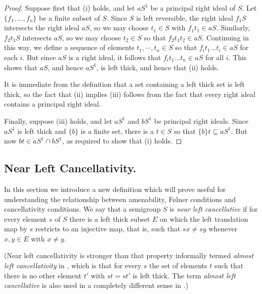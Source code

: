 \documentclass[11pt,a4paper,reqno]{amsart}
\begin{document}
\begin{proof}
Suppose first that (i) holds, and let $aS^1$ be a principal right ideal of
$S$. Let
$\lbrace f_1, \dots, f_n \rbrace$ be a finite subset of $S$. Since $S$ is left
reversible, the right ideal $f_1 S$ intersects the right ideal $aS$, so we may choose $t_1 \in S$ with
$f_1 t_1 \in aS$. Similarly, $f_2 t_1 S$ intersects $aS$, so we may choose
$t_2 \in S$ so that $f_2 t_1 t_2 \in aS$. Continuing in this way, we
define a sequence of elements $t_1, \cdots, t_n \in S$ so that
$f_i t_1 \dots t_i \in aS$ for each $i$. But since $aS$ is a right ideal,
it follows that $f_i t_1 \dots t_n \in aS$ for all $i$. This shows
that $aS$, and hence $a S^1$, is left thick, and hence that (ii) holds.

It is immediate from the definition that a set containing a left thick
set is left thick, so the fact that (ii) implies (iii) follows from the fact
that every right ideal contains a principal right ideal.

Finally, suppose (iii) holds, and let $aS^1$ and $bS^1$ be principal right
ideals. Since $aS^1$ is left thick and $\lbrace b \rbrace$ is a finite set,
there is a $t \in S$ so that $\lbrace b \rbrace t \subseteq aS^1$. But now
$bt \in aS^1 \cap bS^1$, as required to show that (i) holds.
\end{proof}

\subsection{Near Left Cancellativity.} In this section we introduce a
new definition which will prove useful for understanding the relationship
between amenability, F\o lner conditions and cancellativity conditions. 
We say that a semigroup $S$ is \textit{near left cancellative}
if for every element
$s$ of $S$ there is a left thick subset $E$ on which the left translation
map by $s$ restricts to an injective map, that is, such that $sx \neq sy$
whenever $x,y \in E$ with $x \neq y$.

(Near left cancellativity is stronger than that property
informally termed  \textit{almost left cancellativity} in \cite[p.104]{Klawe77},
which is that for every $s$ the set of elements $t$ such
that there is no other element $t'$ with $st = st'$ is left thick. The
term \textit{almost left cancellative} is also used in a completely
different sense in \cite[Section 7.22]{Paterson88}.)
\end{document}
